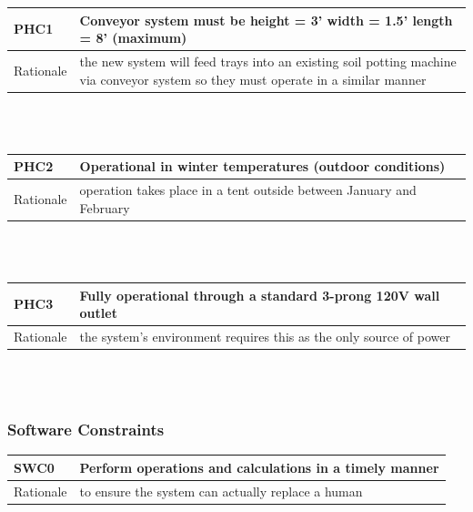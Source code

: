 \documentclass[12pt]{article}
\begin{document}
 \noindent
 \begin{tabular}{ |p{2cm}|p{14cm}| }
  \hline
  PHC1 & Conveyor system must be height = 3'  
  width = 1.5' length = 8' (maximum) \\
  \hline
  Rationale & the new system will feed trays into an existing soil potting 
  machine via conveyor system so they must operate in a similar manner  \\ 

  \hline  
 \end{tabular}\\\\

 \noindent
 \begin{tabular}{ |p{2cm}|p{14cm}| }
  \hline
  PHC2 & Operational in winter temperatures (outdoor conditions)  \\
  \hline
  Rationale & operation takes place in a 
  tent outside between January and February  \\ 

  \hline  
 \end{tabular}\\\\

 \noindent
 \begin{tabular}{ |p{2cm}|p{14cm}| }
  \hline
  PHC3 & Fully operational through a standard 3-prong 120V wall outlet   \\
  \hline
  Rationale & the system’s environment requires this 
  as the only source of power  \\ 

  \hline  
 \end{tabular}\\\\
 
  
\subsubsection{Software Constraints}
\begin{tabular}{ |p{2cm}|p{14cm}| }
  \hline
  SWC0 & Perform operations and calculations in a timely manner \\
  \hline
  Rationale &  to ensure the system can actually replace a human  \\ 

  \hline  
 \end{tabular}\\\\
\end{document}

